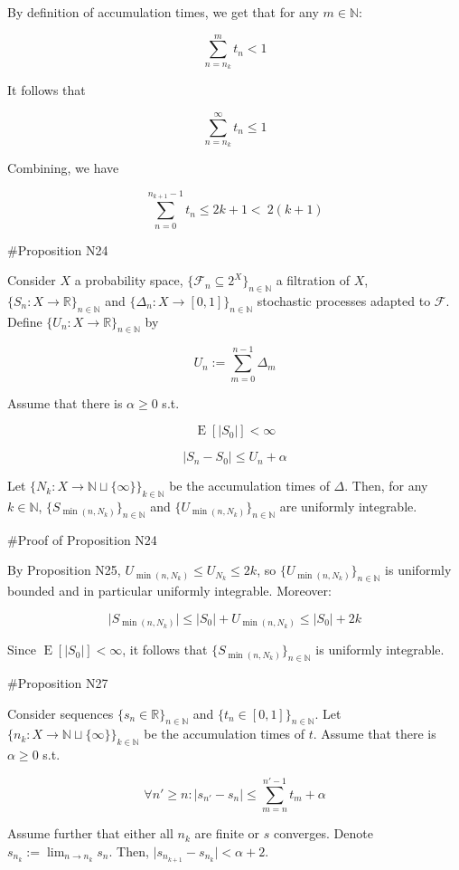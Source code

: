 \documentclass[a4paper]{article}
\DeclareMathOperator{\E}{E}
\newcommand{\Nats}{\mathbb{N}}
\newcommand{\Reals}{\mathbb{R}}
\newcommand{\Sq}[2]{\{#1\}_{#2 \in \Nats}}
\newcommand{\Sqn}[1]{\Sq{#1}{n}}
\newcommand{\Abs}[1]{\lvert #1 \rvert}
\newcommand{\F}{\mathcal{F}}
\begin{document}
By definition of accumulation times, we get that for any ${m \in \Nats}$:

$$\sum_{n = n_k}^{m} t_n < 1$$

It follows that

$$\sum_{n = n_k}^{\infty} t_n \leq 1$$

Combining, we have

$$\sum_{n = 0}^{n_{k+1} - 1} t_n \leq 2k+1 <\ 2(k+1)$$

\#Proposition N24

Consider ${X}$ a probability space, ${\{\F_n \subseteq 2^X\}_{n \in \Nats}}$ a filtration of ${X}$, ${\{S_n:X \rightarrow \Reals\}_{n \in \Nats}}$ and ${\{\Delta_n:X \rightarrow [0,1]\}_{n \in \Nats}}$ stochastic processes adapted to ${\F}$. Define ${\Sqn{U_n: X \rightarrow \Reals}}$ by

$$U_n := \sum_{m=0}^{n-1} \Delta_m$$

Assume that there is ${\alpha \geq 0}$ s.t.

$$\E[\Abs{S_0}] < \infty$$

$$\Abs{S_{n}-S_0} \leq U_n + \alpha$$

Let ${\{N_k: X \rightarrow \Nats \sqcup \{\infty\}\}_{k \in \Nats}}$ be the accumulation times of ${\Delta}$. Then, for any ${k \in \Nats}$, ${\Sqn{S_{\min(n,N_k)}}}$ and ${\Sqn{U_{\min(n,N_k)}}}$ are uniformly integrable.

\#Proof of Proposition N24

By Proposition N25, $U_{\min(n,N_k)} \leq U_{N_k} \leq 2k$, so ${\Sqn{U_{\min(n,N_k)}}}$ is uniformly bounded and in particular uniformly integrable. Moreover:

$$\Abs{S_{\min(n,N_k)}} \leq \Abs{S_0} + U_{\min(n,N_k)} \leq \Abs{S_0} + 2k$$

Since ${\E[\Abs{S_0}] < \infty}$, it follows that ${\Sqn{S_{\min(n,N_k)}}}$ is uniformly integrable.

\#Proposition N27

Consider sequences ${\Sqn{s_n \in \Reals}}$ and ${\Sqn{t_n \in [0,1]}}$. Let ${\{n_k: X \rightarrow \Nats \sqcup \{\infty\}\}_{k \in \Nats}}$ be the accumulation times of ${t}$. Assume that there is ${\alpha \geq 0}$ s.t.

$${\forall n' \geq n: \Abs{s_{n'} - s_n} \leq \sum_{m=n}^{n'-1} t_m + \alpha}$$

Assume further that either all ${n_{k}}$ are finite or $s$ converges. Denote $s_{n_k}:=\lim_{n \rightarrow n_k} s_n$. Then, ${\Abs{s_{n_{k+1}}-s_{n_k}} < \alpha + 2}$.
\end{document}
